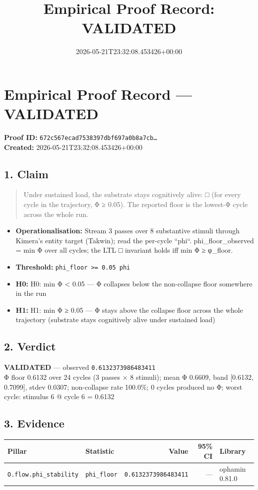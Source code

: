 \documentclass{article}
\title{Empirical Proof Record: VALIDATED}
\date{2026-05-21T23:32:08.453426+00:00}
\begin{document}
\maketitle
\section*{Empirical Proof Record --- \textcolor{validated}{\textbf{VALIDATED}}}
\textbf{Proof ID:} \texttt{672c567ecad7538397dbf697a0b8a7cb\dots}\\
\textbf{Created:} 2026-05-21T23:32:08.453426+00:00
\subsection*{1. Claim}
\begin{quote}Under sustained load, the substrate stays cognitively alive: □ (for every cycle in the trajectory, Φ ≥ 0.05). The reported floor is the lowest-Φ cycle across the whole run.\end{quote}
\begin{itemize}
\item \textbf{Operationalisation:} Stream 3 passes over 8 substantive stimuli through Kimera's entity target (Takwin); read the per-cycle ``phi``. phi\_floor\_observed = min Φ over all cycles; the LTL □ invariant holds iff min Φ ≥ φ\_floor.
\item \textbf{Threshold:} \texttt{phi\_floor >= 0.05 phi}
\item \textbf{H0:} H0: min Φ < 0.05 — Φ collapses below the non-collapse floor somewhere in the run
\item \textbf{H1:} H1: min Φ ≥ 0.05 — Φ stays above the collapse floor across the whole trajectory (substrate stays cognitively alive under sustained load)
\end{itemize}
\subsection*{2. Verdict}
\textcolor{validated}{\textbf{VALIDATED}} --- observed \texttt{0.6132373986483411}\\
Φ floor 0.6132 over 24 cycles (3 passes × 8 stimuli); mean Φ 0.6609, band [0.6132, 0.7099], stdev 0.0307; non-collapse rate 100.0\%; 0 cycles produced no Φ; worst cycle: stimulus 6 @ cycle 6 = 0.6132
\subsection*{3. Evidence}
\begin{tabular}{llrrl}\toprule
\textbf{Pillar} & \textbf{Statistic} & \textbf{Value} & \textbf{95\% CI} & \textbf{Library} \\\midrule
\texttt{O.flow.phi\_stability} & \texttt{phi\_floor} & \texttt{0.6132373986483411} & --- & ophamin 0.81.0 \\
\bottomrule\end{tabular}
\end{document}
